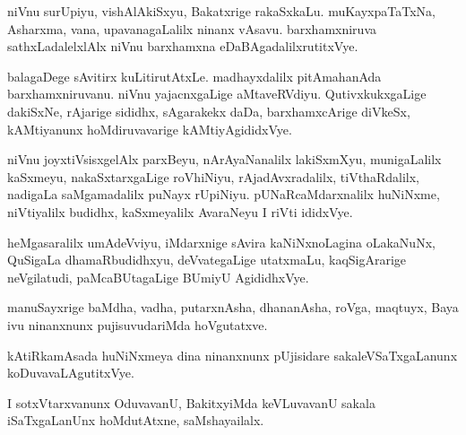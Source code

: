 \documentclass{article}
\begin{document}
\begin{mn}
niVnu  surUpiyu,  vishAlAkiSxyu,  Bakatxrige  rakaSxkaLu.  muKayxpaTaTxNa,  
Asharxma,  vana,  upavanagaLalilx  ninanx  vAsavu.  barxhamxniruva  
sathxLadalelxlAlx  niVnu  barxhamxna  eDaBAgadalilxrutitxVye.
\end{mn}

\begin{mn}
balagaDege  sAvitirx  kuLitirutAtxLe.  madhayxdalilx  pitAmahanAda  
barxhamxniruvanu.  niVnu  yajacnxgaLige  aMtaveRVdiyu.  QutivxkukxgaLige  
dakiSxNe,  rAjarige  sididhx,  sAgarakekx  daDa,  barxhamxcArige  diVkeSx,  
kAMtiyanunx  hoMdiruvavarige  kAMtiyAgididxVye.
\end{mn}

\begin{mn}
niVnu  joyxtiVsisxgelAlx  parxBeyu,  nArAyaNanalilx  lakiSxmXyu,  munigaLalilx  
kaSxmeyu,  nakaSxtarxgaLige  roVhiNiyu,  rAjadAvxradalilx,  tiVthaRdalilx,  nadigaLa  
saMgamadalilx  puNayx rUpiNiyu.  pUNaRcaMdarxnalilx huNiNxme,  niVtiyalilx  
budidhx,  kaSxmeyalilx AvaraNeyu  I riVti  ididxVye.
\end{mn}

\begin{mn}
heMgasaralilx  umAdeVviyu,  iMdarxnige  sAvira  kaNiNxnoLagina  oLakaNuNx,  
QuSigaLa  dhamaRbudidhxyu,  deVvategaLige  utatxmaLu,  kaqSigArarige  
neVgilatudi,  paMcaBUtagaLige  BUmiyU  AgididhxVye.
\end{mn}

\begin{mn}
manuSayxrige  baMdha,  vadha,  putarxnAsha,  dhananAsha,  roVga,  
maqtuyx, Baya ivu  ninanxnunx  pujisuvudariMda  hoVgutatxve. 
\end{mn}

\begin{mn}
kAtiRkamAsada  huNiNxmeya dina ninanxnunx  pUjisidare  sakaleVSaTxgaLanunx  koDuvavaLAgutitxVye.                                                                                                                                                                           
\end{mn}

\begin{mn}
I sotxVtarxvanunx  OduvavanU,  BakitxyiMda  keVLuvavanU  sakala iSaTxgaLanUnx  
hoMdutAtxne,  saMshayailalx.                                                                                                                                                                                                                                                                                                                                                                                    
\end{mn}
\end{document}
